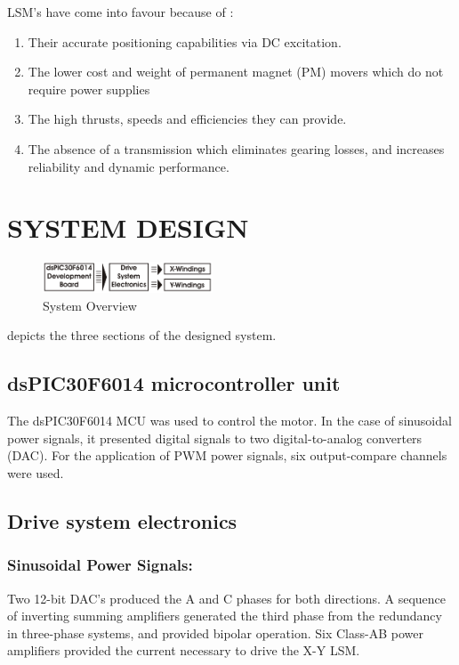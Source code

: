 \documentclass[10pt,twocolumn]{witseiepaper}
\begin{document}
LSM's have come into favour because of \cite{Halbach-1,XY-Thrust}:
\begin{enumerate}
	\item Their accurate positioning capabilities via DC excitation.
	\item The lower cost and weight of permanent magnet (PM) movers which do not require power supplies
	\item The high thrusts, speeds and efficiencies they can provide.
	\item The absence of a transmission which eliminates gearing losses, and increases reliability and dynamic performance.
\end{enumerate}

\section{SYSTEM DESIGN}

\begin{figure}[ht]
	\centering
		\includegraphics[width=0.45\textwidth]{../../Drawings/Flow-Diagram.pdf}
	\caption{System Overview}
	\label{fig:Sys}
\end{figure}
 depicts the three sections of the designed system.

\subsection{dsPIC30F6014 microcontroller unit}
The dsPIC30F6014 MCU \cite{Microchip} was used to control the motor.  In the
case of sinusoidal power signals, it presented digital signals to two
digital-to-analog converters (DAC).  For the application of PWM power signals,
six output-compare channels were used.
 
\subsection{Drive system electronics}

\subsubsection*{Sinusoidal Power Signals:}
Two 12-bit DAC's produced the A and C phases for both directions.  A sequence
of inverting summing amplifiers generated the third phase from the redundancy
in three-phase systems, and provided bipolar operation.  Six Class-AB power
amplifiers provided the current necessary to drive the X-Y LSM.
\end{document}
